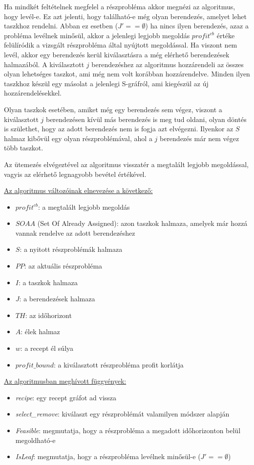 Ha mindkét feltételnek megfelel a részprobléma akkor megnézi az algoritmus, hogy levél-e. Ez azt jelenti, hogy található-e még olyan berendezés, amelyet lehet taszkhoz rendelni. Abban ez esetben ($J'== \emptyset$) ha nincs ilyen berendezés, azaz a probléma levélnek minősül, akkor a jelenlegi legjobb megoldás $profit^{cb}$ értéke felülíródik a vizsgált részprobléma által nyújtott megoldással. Ha viszont nem levél, akkor egy berendezés kerül kiválasztásra a még elérhető berendezések halmazából. A kiválasztott $j$ berendezéshez az algoritmus hozzárendeli az összes olyan lehetséges taszkot, ami még nem volt korábban hozzárendelve. Minden ilyen taszkhoz készül egy másolat a jelenlegi S-gráfról, ami kiegészül az új hozzárendelésekkel.

Olyan taszkok esetében, amiket még egy berendezés sem végez, viszont a kiválasztott $j$ berendezésen kívül más berendezés is meg tud oldani, olyan döntés is születhet, hogy az adott berendezés nem is fogja azt elvégezni. Ilyenkor az $S$ halmaz kibővül egy olyan részproblémával, ahol a $j$ berendezés már nem végez több taszkot. 

Az ütemezés elvégeztével az algoritmus visszatér a megtalált legjobb megoldással, vagyis az elérhető legnagyobb bevétel értékével.

\newpage
\underline{Az algoritmus változóinak elnevezése a következő:}
\begin{itemize}
	\item $profit^{cb}$: a megtalált legjobb megoldás
	\item $SOAA$ (Set Of Already Assigned): azon taszkok halmaza, amelyek már hozzá vannak rendelve az adott berendezéshez
	\item $S$: a nyitott részproblémák halmaza
	\item $PP$: az aktuális részprobléma
	\item $I$: a taszkok halmaza
	\item $J$: a berendezések halmaza
	\item $TH$: az időhorizont
	\item $A$: élek halmaz
	\item $w$: a recept él súlya
	\item $profit\_bound$: a kiválasztott részprobléma profit korlátja
\end{itemize}

\underline{Az algoritmusban meghívott függvények:}
\begin{itemize}
	\item \textit{recipe}: egy recept gráfot ad vissza
	\item \textit{select\_remove}: kiválaszt egy részproblémát valamilyen módszer alapján
	\item \textit{Feasible}: megmutatja, hogy a részprobléma a megadott időhorizonton belül megoldható-e
	\item \textit{IsLeaf}: megmutatja, hogy a részprobléma levélnek minősül-e ($J'==\emptyset$)
\end{itemize}

